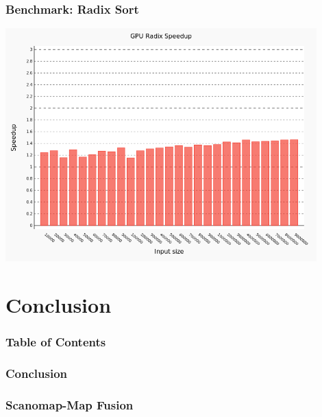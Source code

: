 \documentclass{beamer}
\begin{document}
\begin{frame}
 \frametitle{Benchmark: Radix Sort}
    \includegraphics[width=0.9\textwidth]{../images/radix-comparing.png}
\end{frame}

\section[con]{Conclusion}
\begin{frame}
\frametitle{Table of Contents}
\tableofcontents[currentsection]
\end{frame}

\begin{frame}
 \frametitle{Conclusion}
\end{frame}
\begin{frame}
 \frametitle{Scanomap-Map Fusion}
\end{frame}
\end{document}
